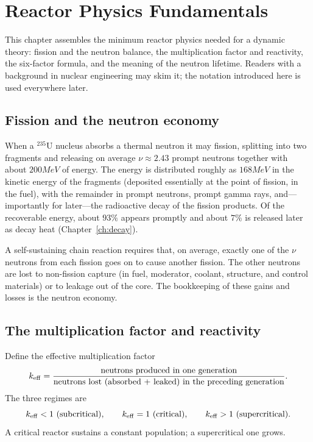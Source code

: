 \chapter{Reactor Physics Fundamentals}
\label{ch:physics}

This chapter assembles the minimum reactor physics needed for a dynamic theory:
fission and the neutron balance, the multiplication factor and reactivity, the
six-factor formula, and the meaning of the neutron lifetime. Readers with a
background in nuclear engineering may skim it; the notation introduced here is
used everywhere later.

\section{Fission and the neutron economy}

When a $^{235}$U nucleus absorbs a thermal neutron it may fission, splitting into
two fragments and releasing on average $\nu\approx 2.43$ prompt neutrons together
with about $200\unit{MeV}$ of energy. The energy is distributed roughly as
$168\unit{MeV}$ in the kinetic energy of the fragments (deposited essentially at
the point of fission, in the fuel), with the remainder in prompt neutrons,
prompt gamma rays, and---importantly for later---the radioactive decay of the
fission products. Of the recoverable energy, about $93\%$ appears promptly and
about $7\%$ is released later as decay heat (Chapter~\ref{ch:decay}).

A self-sustaining chain reaction requires that, on average, exactly one of the
$\nu$ neutrons from each fission goes on to cause another fission. The other
neutrons are lost to non-fission capture (in fuel, moderator, coolant,
structure, and control materials) or to leakage out of the core. The bookkeeping
of these gains and losses is the neutron economy.

\section{The multiplication factor and reactivity}

Define the effective multiplication factor
\begin{equation}
k_{\mathrm{eff}} = \frac{\text{neutrons produced in one generation}}
             {\text{neutrons lost (absorbed + leaked) in the preceding generation}}.
\end{equation}
The three regimes are
\begin{equation}
k_{\mathrm{eff}} < 1 \ (\text{subcritical}),\qquad
k_{\mathrm{eff}} = 1 \ (\text{critical}),\qquad
k_{\mathrm{eff}} > 1 \ (\text{supercritical}).
\end{equation}
A critical reactor sustains a constant population; a supercritical one grows.

